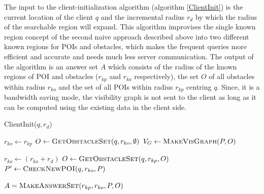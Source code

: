 \documentclass{sig-alternate}
\begin{document}
The input to the client-initialization algorithm (algorithm \ref{ClientInit}) is the current location of the client $q$ and the incremental radius $r_d$ by which the radius of the searchable region will expand. This algorithm improvises the single known region concept of the second naive approach described above into two different known regions for POIs and obstacles, which makes the frequent queries more efficient and accurate and needs much less server communication. The output of the algorithm is an answer set $A$ which consists of the radius of the known regions of POI and obstacles ($r_{kp}$ and $r_{ko}$ respectively), the set $O$ of all obstacles within radius $r_{ko}$ and the set of all POIs within radius $r_{kp}$ centring $q$. Since, it is a bandwidth saving mode, the visibility graph is not sent to the client as long as it can be computed using the existing data in the client side.

\begin{algorithm}
\caption{ClientInit($q,r_d$)}
\label{ClientInit}

    
	 $r_{ko} \gets r_{kp} $ \; %
	 $O \gets \textsc{GetObstacleSet}(q, r_{ko}, \emptyset)$ \;
	 $V_G \gets \textsc{MakeVisGraph}(P, O)$ \;
	  { 
		$r_{ko} \gets (r_{ko} + r_d)$ \;
		$O \gets \textsc{GetObstacleSet}(q, r_{kp}, O)$ \;
		$P' \gets \textsc{CheckNewPOI}(q, r_{ko}, P)$ \;
		
	} \label{while}
	
	 \Return $A = \textsc{MakeAnswerSet}(r_{kp}, r_{ko}, P, O)$ 
\end{algorithm}
\end{document}
